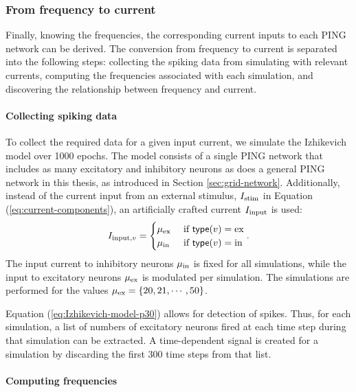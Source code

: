 \subsubsection{From frequency to current}

Finally, knowing the frequencies, the corresponding current inputs to each PING network can be derived. The conversion from frequency to current is separated into the following steps: collecting the spiking data from simulating with relevant currents, computing the frequencies associated with each simulation, and discovering the relationship between frequency and current.

\paragraph{Collecting spiking data}

To collect the required data for a given input current, we simulate the Izhikevich model over 1000 epochs. The model consists of a single PING network that includes as many excitatory and inhibitory neurons as does a general PING network in this thesis, as introduced in Section \ref{sec:grid-network}. Additionally, instead of the current input from an external stimulus, $I_{\mathrm{stim}}$ in Equation (\ref{eq:current-components}), an artificially crafted current $I_{\mathrm{input}}$ is used:
\begin{equation}
    I_{\mathrm{input}, v} = \begin{cases}
        \mu_{\mathrm{ex}} & \text{ if } \mathsf{type}(v) = \mathrm{ex} \\
        \mu_{\mathrm{in}} & \text{ if } \mathsf{type}(v) = \mathrm{in}
    \end{cases}.
\end{equation}
The input current to inhibitory neurons $\mu_{\mathrm{in}}$ is fixed for all simulations, while the input to excitatory neurons $\mu_{\mathrm{ex}}$ is modulated per simulation. The simulations are performed for the values $\mu_{\mathrm{ex}} = \{ 20, 21, \cdots, 50 \}$.

Equation (\ref{eq:Izhikevich-model-p30}) allows for detection of spikes. Thus, for each simulation, a list of numbers of excitatory neurons fired at each time step during that simulation can be extracted. A time-dependent signal is created for a simulation by discarding the first 300 time steps from that list.

\paragraph{Computing frequencies}

